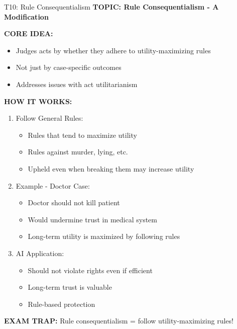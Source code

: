 \documentclass[8pt]{beamer}
\begin{document}
	\begin{frame}{T10: Rule Consequentialism}
		\fontsize{6.5}{7.5}\selectfont
		\textbf{TOPIC: Rule Consequentialism - A Modification}
		
		\vspace{0.1cm}
		\textbf{CORE IDEA:}
		\begin{itemize}
			\item Judges acts by whether they adhere to utility-maximizing rules
			\item Not just by case-specific outcomes
			\item Addresses issues with act utilitarianism
		\end{itemize}
		
		\vspace{0.1cm}
		\textbf{HOW IT WORKS:}
		\begin{enumerate}
			\item \textcolor{myblue}{Follow General Rules:}
			\begin{itemize}
				\item Rules that tend to maximize utility
				\item Rules against murder, lying, etc.
				\item Upheld even when breaking them may increase utility
			\end{itemize}
			\item \textcolor{myblue}{Example - Doctor Case:}
			\begin{itemize}
				\item Doctor should not kill patient
				\item Would undermine trust in medical system
				\item Long-term utility is maximized by following rules
			\end{itemize}
			\item \textcolor{myblue}{AI Application:}
			\begin{itemize}
				\item Should not violate rights even if efficient
				\item Long-term trust is valuable
				\item Rule-based protection
			\end{itemize}
		\end{enumerate}
		
		\textcolor{myred}{\textbf{EXAM TRAP:}} Rule consequentialism = \textcolor{myblue}{follow utility-maximizing rules}!
	\end{frame}
	
	
\end{document}
